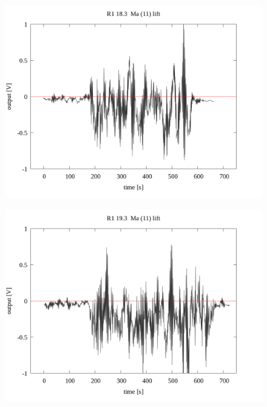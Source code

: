 \documentclass[a4paper]{jsarticle}
\begin{document}
\begin{figure}[htbp]
    \footnotesize
    \begin{center}
        \includegraphics[width=140mm]{../../../33_result/210806/moving_average/11/lift/R1_18.6_ma(11)_lift.png}
    \end{center}
\end{figure}

\begin{figure}[htbp]
    \footnotesize
    \begin{center}
        \includegraphics[width=140mm]{../../../33_result/210806/moving_average/11/lift/R1_19.3_ma(11)_lift.png}
    \end{center}
\end{figure}
\end{document}
